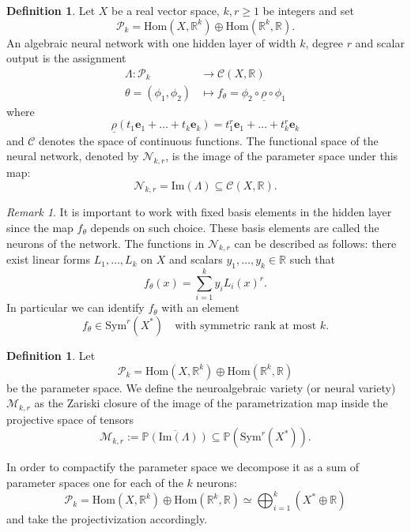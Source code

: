 \documentclass[11pt]{article}
\numberwithin{equation}{section}
\numberwithin{figure}{section}
\theoremstyle{plain}
\theoremstyle{definition}
\newtheorem{defn}[thm]{Definition}
\theoremstyle{remark}
\newtheorem{rem}[thm]{Remark}
\newcommand{\op}{\oplus}
\newcommand{\R}{\mathbb{R}}
\renewcommand{\P}{\mathbb{P}}
\newcommand{\im}{\mathrm{Im}}
\newcommand{\Hom}{\mathrm{Hom}}
\begin{document}
\begin{defn}
Let $X$ be a real vector space, $k,r\ge1$ be integers and set
\[
\mathcal{P}_{k} = \Hom\left( X,\R^{k} \right) \oplus
\Hom\left( \R^{k} , \R \right).
\]
An algebraic neural network with one hidden layer of width $k$,
degree $r$ and scalar output is the assignment
\begin{align*}
\Lambda:\mathcal{P}_{k} &\longrightarrow \mathcal{C}\left( X,\R \right)\\
\theta=\left( \phi_{1},\phi_{2} \right) &\longmapsto f_{\theta} = \phi_{2}\circ\underline{\rho}\circ\phi_{1}
\end{align*}
where
\[
\underline{\rho}
\left(
t_{1}{\mathbf e}_{1}+\dots+t_{k}{\mathbf e}_{k}
\right)
=
t_{1}^{r}{\mathbf e}_{1}+\dots+t_{k}^{r}{\mathbf e}_{k}
\]
and $\mathcal{C}$ denotes the space of continuous functions. The functional space of the neural network, denoted by $\mathcal{N}_{k,r}$, is the image of the parameter space under this map:
\[
\mathcal{N}_{k,r} = \im\left( \Lambda \right) \subseteq \mathcal{C}\left( X,\R \right).
\]
\end{defn}

\begin{rem}
It is important to work with fixed basis elements in the hidden layer
since the map $f_{\theta}$ depends on such choice. These basis elements
are called the neurons of the network. The functions in
$\mathcal{N}_{k,r}$ can be described as follows: there exist linear
forms $L_{1},\dots,L_{k}$ on $X$ and scalars $y_{1},\dots,y_{k}\in \R$
such that
\begin{equation}
f_{\theta}\left( x \right)
=
\sum_{i=1}^{k} y_{i} L_{i}\left( x \right)^{r}.
\label{eq:f_thetaExplicit}
\end{equation}
In particular we can identify $f_{\theta}$ with an element
\begin{equation}
f_{\theta}
\in
\mathrm{Sym}^{r}\left( X^{\ast} \right)
\quad\text{with symmetric rank at most } k.
\label{eq:PartiallySymmetricTensor}
\end{equation}
\end{rem}

\begin{defn}
Let
\[
\mathcal{P}_{k} = \Hom\left( X,\R^{k} \right) \oplus \Hom\left( \R^{k} , \R \right)
\]
be the parameter space. We define the neuroalgebraic variety (or neural
variety) $\mathcal{M}_{k,r}$ as the Zariski closure of the image of the
parametrization map inside the projective space of tensors
\[
\mathcal{M}_{k,r} := \overline{ \P\left( \im\left( \Lambda \right) \right) } \subseteq \P\left(  \mathrm{Sym}^{r}\left( X^{\ast} \right) \right).
\]
\end{defn}
In order to compactify the parameter space we decompose it as a sum
of parameter spaces one for each of the $k$ neurons:
\[
\mathcal{P}_{k} = \Hom\left( X,\R^{k} \right) \oplus \Hom\left( \R^{k} , \R \right) \simeq \bigoplus_{i=1}^{k} \left( X^{\ast} \op \R \right)
\]
and take the projectivization accordingly.
\end{document}
